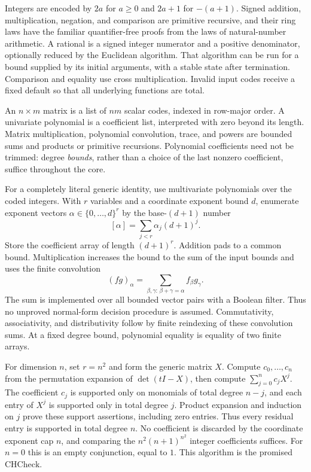 Integers are encoded by $2a$ for $a\ge0$ and $2a+1$ for $-(a+1)$.
Signed addition, multiplication, negation, and comparison are primitive
recursive, and their ring laws have the familiar quantifier-free proofs
from the laws of natural-number arithmetic. A rational is a signed
integer numerator and a positive denominator, optionally reduced by the
Euclidean algorithm. That algorithm can be run for a bound supplied by
its initial arguments, with a stable state after termination. Comparison
and equality use cross multiplication. Invalid input codes receive a
fixed default so that all underlying functions are total.

An $n\times m$ matrix is a list of $nm$ scalar codes, indexed in row-major
order. A univariate polynomial is a coefficient list, interpreted with
zero beyond its length. Matrix multiplication, polynomial convolution,
trace, and powers are bounded sums and products or primitive recursions.
Polynomial coefficients need not be trimmed: degree \emph{bounds}, rather
than a choice of the last nonzero coefficient, suffice throughout the core.

For a completely literal generic identity, use multivariate polynomials
over the coded integers. With $r$ variables and a coordinate exponent
bound $d$, enumerate exponent vectors $\alpha\in\{0,\ldots,d\}^{r}$
by the base-$(d+1)$ number
\[
                    [\alpha]=\sum_{j<r}\alpha_j(d+1)^j.
\]
Store the coefficient array of length $(d+1)^r$. Addition pads to a common
bound. Multiplication increases the bound to the sum of the input bounds
and uses the finite convolution
\[
 (fg)_\alpha=\sum_{\beta,\gamma:\,\beta+\gamma=\alpha}
                       f_\beta g_\gamma.
\]
The sum is implemented over all bounded vector pairs with a Boolean
filter. Thus no unproved normal-form decision procedure is assumed.
Commutativity, associativity, and distributivity follow by finite
reindexing of these convolution sums. At a fixed degree bound, polynomial
equality is equality of two finite arrays.

For dimension $n$, set $r=n^2$ and form the generic matrix $X$. Compute
$c_0,\ldots,c_n$ from the permutation expansion of $\det(tI-X)$, then
compute $\sum_{j=0}^{n}c_jX^j$. The coefficient $c_j$ is supported only on
monomials of total degree $n-j$, and each entry of $X^j$ is supported
only in total degree $j$. Product expansion and induction on $j$ prove
these support assertions, including zero entries. Thus every residual
entry is supported in total degree $n$. No coefficient is discarded by
the coordinate exponent cap $n$, and comparing
the $n^2(n+1)^{n^2}$ integer coefficients suffices. For $n=0$ this is an
empty conjunction, equal to $1$. This algorithm is the promised
$\mathrm{CHCheck}$.

